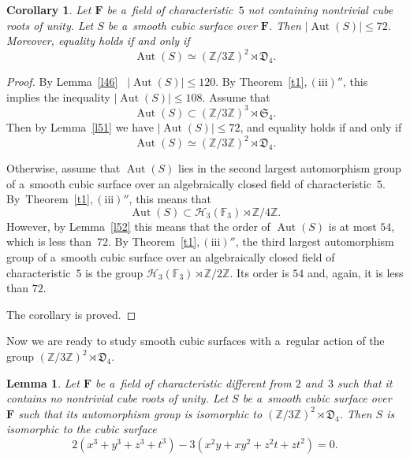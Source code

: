 \documentclass{amsart}
\numberwithin{equation}{section}
\theoremstyle{plain}
\newtheorem{lemma}{Lemma}
\newtheorem{corollary}{Corollary}
\theoremstyle{definition}
\theoremstyle{remark}
\begin{document}
\begin{corollary}
\label{c7}
Let $\mathbf{F}$ be a~field of characteristic~$5$ not containing nontrivial cube roots of unity. Let $S$ be a~smooth cubic surface over $\mathbf{F}$. Then $|{\operatorname{Aut}(S)}| \leqslant 72$. Moreover, equality holds if and only if
$$
\operatorname{Aut}(S) \simeq (\mathbb{Z}/3\mathbb{Z})^2 \rtimes \mathfrak{D}_4.
$$
\end{corollary}

\begin{proof}
By Lemma~\ref{l46} \ $|{\operatorname{Aut}(S)}| \leqslant 120$. By Theorem~\ref{t1},\,$(\mathrm{iii})''$, this implies the inequality $|{\operatorname{Aut}(S)}| \leqslant 108$. Assume that
$$
\operatorname{Aut}(S) \subset (\mathbb{Z}/3\mathbb{Z})^3 \rtimes \mathfrak{S}_4.
$$
Then by Lemma~\ref{l51} we have $|{\operatorname{Aut}(S)}| \leqslant 72$, and equality holds if and only if
$$
\operatorname{Aut}(S) \simeq (\mathbb{Z}/3\mathbb{Z})^2 \rtimes \mathfrak{D}_4.
$$

Otherwise, assume that $\operatorname{Aut}(S)$ lies in the
 second
largest automorphism group of a~smooth cubic surface over an algebraically closed field of characteristic~$5$. By~Theorem~\ref{t1},\,$(\mathrm{iii})''$, this means that
$$
\operatorname{Aut}(S) \subset \mathcal{H}_3(\mathbb{F}_3) \rtimes \mathbb{Z}/4\mathbb{Z}.
$$
However, by Lemma~\ref{l52} this means that the order of $\operatorname{Aut}(S)$ is at most $54$, which is less than~$72$. By Theorem~\ref{t1},\,$(\mathrm{iii})''$, the third largest automorphism group of a~smooth cubic surface over an algebraically closed field of characteristic~$5$ is the group $\mathcal{H}_3(\mathbb{F}_3) \rtimes \mathbb{Z}/2\mathbb{Z}$. Its order is $54$ and, again, it is less than $72$.

The corollary is proved.
\end{proof}

Now we are ready to study smooth cubic surfaces with a~regular action of the group $(\mathbb{Z}/3\mathbb{Z})^2 \rtimes \mathfrak{D}_4$.

\begin{lemma}
\label{l53}
Let $\mathbf{F}$ be a~field of characteristic different from $2$ and~$3$ such that it contains no nontrivial cube roots of unity. Let $S$ be a~smooth cubic surface over~$\mathbf{F}$ such that its automorphism group is isomorphic to $(\mathbb{Z}/3\mathbb{Z})^2 \rtimes \mathfrak{D}_4$. Then $S$ is isomorphic to the cubic surface
$$
2(x^3+y^3+z^3+t^3)-3(x^2y+xy^2+z^2t+zt^2)=0.
$$
\end{lemma}
\end{document}
